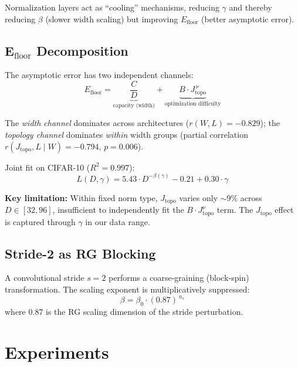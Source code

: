 \documentclass[11pt, a4paper]{article}
\theoremstyle{plain}
\begin{document}
Normalization layers act as ``cooling'' mechanisms, reducing $\gamma$ and thereby reducing $\beta$ (slower width scaling) but improving $E_{\mathrm{floor}}$ (better asymptotic error).

\subsection{E$_{\mathrm{floor}}$ Decomposition}

The asymptotic error has two independent channels:
\begin{equation}
E_{\mathrm{floor}} = \underbrace{\frac{C}{D}}_{\text{capacity (width)}} + \underbrace{B \cdot J_{\mathrm{topo}}^{\,\nu}}_{\text{optimization difficulty}}
\end{equation}

The \emph{width channel} dominates across architectures ($r(W, L) = -0.829$); the \emph{topology channel} dominates \emph{within} width groups (partial correlation $r(J_{\mathrm{topo}}, L \mid W) = -0.794$, $p = 0.006$).

Joint fit on CIFAR-10 ($R^2 = 0.997$):
\begin{equation}
L(D, \gamma) = 5.43 \cdot D^{-\beta(\gamma)} - 0.21 + 0.30 \cdot \gamma
\end{equation}

\textbf{Key limitation:} Within fixed norm type, $J_{\mathrm{topo}}$ varies only $\sim 9\%$ across $D \in [32, 96]$, insufficient to independently fit the $B \cdot J_{\mathrm{topo}}^{\nu}$ term. The $J_{\mathrm{topo}}$ effect is captured through $\gamma$ in our data range.

\subsection{Stride-2 as RG Blocking}

A convolutional stride $s=2$ performs a coarse-graining (block-spin) transformation. The scaling exponent is multiplicatively suppressed:
\begin{equation}
\beta = \beta_0 \cdot (0.87)^{\,n_s}
\end{equation}
where $0.87$ is the RG scaling dimension of the stride perturbation.

\section{Experiments}
\end{document}
